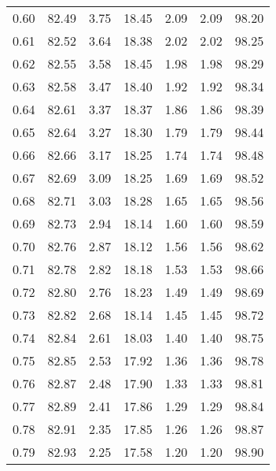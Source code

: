 \begin{tabular}{|c|c|c|c|c|c|c|}
      0.60 &     82.49 &      3.75 &      18.45 &    2.09 &       2.09 &         98.20 \\
      0.61 &     82.52 &      3.64 &      18.38 &    2.02 &       2.02 &         98.25 \\
      0.62 &     82.55 &      3.58 &      18.45 &    1.98 &       1.98 &         98.29 \\
      0.63 &     82.58 &      3.47 &      18.40 &    1.92 &       1.92 &         98.34 \\
      0.64 &     82.61 &      3.37 &      18.37 &    1.86 &       1.86 &         98.39 \\
      0.65 &     82.64 &      3.27 &      18.30 &    1.79 &       1.79 &         98.44 \\
      0.66 &     82.66 &      3.17 &      18.25 &    1.74 &       1.74 &         98.48 \\
      0.67 &     82.69 &      3.09 &      18.25 &    1.69 &       1.69 &         98.52 \\
      0.68 &     82.71 &      3.03 &      18.28 &    1.65 &       1.65 &         98.56 \\
      0.69 &     82.73 &      2.94 &      18.14 &    1.60 &       1.60 &         98.59 \\
      0.70 &     82.76 &      2.87 &      18.12 &    1.56 &       1.56 &         98.62 \\
      0.71 &     82.78 &      2.82 &      18.18 &    1.53 &       1.53 &         98.66 \\
      0.72 &     82.80 &      2.76 &      18.23 &    1.49 &       1.49 &         98.69 \\
      0.73 &     82.82 &      2.68 &      18.14 &    1.45 &       1.45 &         98.72 \\
      0.74 &     82.84 &      2.61 &      18.03 &    1.40 &       1.40 &         98.75 \\
      0.75 &     82.85 &      2.53 &      17.92 &    1.36 &       1.36 &         98.78 \\
      0.76 &     82.87 &      2.48 &      17.90 &    1.33 &       1.33 &         98.81 \\
      0.77 &     82.89 &      2.41 &      17.86 &    1.29 &       1.29 &         98.84 \\
      0.78 &     82.91 &      2.35 &      17.85 &    1.26 &       1.26 &         98.87 \\
      0.79 &     82.93 &      2.25 &      17.58 &    1.20 &       1.20 &         98.90 \\

\end{tabular}
